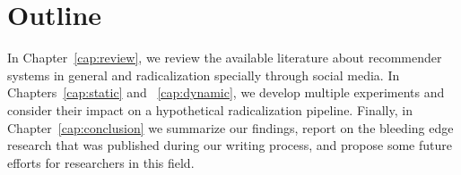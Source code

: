 \section{Outline}
\label{sec:outline}

In Chapter~\ref{cap:review}, we review the available literature about
recommender systems in general and radicalization specially through social
media. In Chapters~\ref{cap:static} and ~\ref{cap:dynamic}, we develop multiple
experiments and consider their impact on a hypothetical radicalization pipeline.
Finally, in Chapter~\ref{cap:conclusion} we summarize our findings, report on
the bleeding edge research that was published during our writing process, and
propose some future efforts for researchers in this field.

